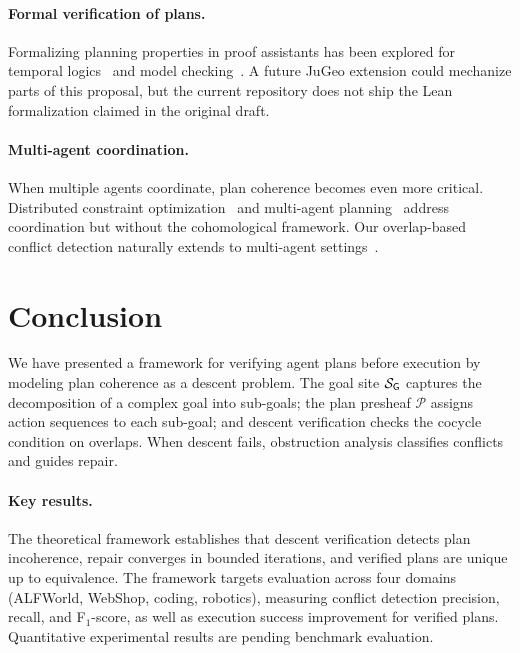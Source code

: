 \documentclass[11pt]{article}
\newcommand{\PlanSheaf}{\mathcal{P}}
\newcommand{\GoalSite}{\Site_{\mathsf{G}}}
\begin{document}
\paragraph{Formal verification of plans.}
Formalizing planning properties in proof assistants has been
explored for temporal logics~\cite{gastin2001fast} and model
checking~\cite{clarke2018handbook}.  A future JuGeo extension could
mechanize parts of this proposal, but the current repository does not
ship the Lean formalization claimed in the original draft.

\paragraph{Multi-agent coordination.}
When multiple agents coordinate, plan coherence becomes even
more critical.  Distributed constraint
optimization~\cite{dcop} and multi-agent
planning~\cite{de2003plan} address coordination but without
the cohomological framework.  Our overlap-based conflict
detection naturally extends to multi-agent
settings~\cite{paper37,paper42}.


\section{Conclusion}\label{sec:conclusion}

We have presented a framework for verifying agent plans before
execution by modeling plan coherence as a descent problem.  The
goal site $\GoalSite$ captures the decomposition of a complex
goal into sub-goals; the plan presheaf $\PlanSheaf$ assigns
action sequences to each sub-goal; and descent verification
checks the cocycle condition on overlaps.  When descent fails,
obstruction analysis classifies conflicts and guides repair.

\paragraph{Key results.}
The theoretical framework establishes that descent verification
detects plan incoherence, repair converges in bounded iterations,
and verified plans are unique up to equivalence.  The framework
targets evaluation across four domains (ALFWorld, WebShop, coding,
robotics), measuring conflict detection precision, recall, and
F$_1$-score, as well as execution success improvement for
verified plans.  Quantitative experimental results are pending
benchmark evaluation.
\end{document}
